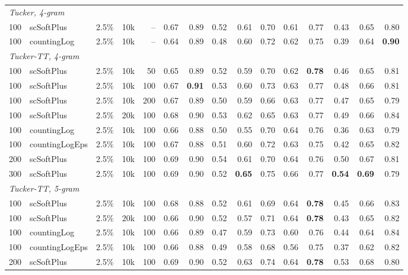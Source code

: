\begin{table}[t]
\begin{tabular}{rlrrrrrrrrrrrrr}
    \midrule
    \multicolumn{15}{l}{\textit{Tucker, 4-gram}} \\
    100 & scSoftPlus & 2.5\% & 10k & -- & 0.67 & 0.89 & 0.52 & 0.61 & 0.70 & 0.61 & 0.77 & 0.43 & 0.65 & 0.80 \\
    100 & countingLog & 2.5\% & 10k & -- & 0.64 & 0.89 & 0.48 & 0.60 & 0.72 & 0.62 & 0.75 & 0.39 & 0.64 & \textbf{0.90} \\
    \midrule
    \multicolumn{15}{l}{\textit{Tucker-TT, 4-gram}} \\
    100 & scSoftPlus & 2.5\% & 10k & 50 & 0.65 & 0.89 & 0.52 & 0.59 & 0.70 & 0.62 & \textbf{0.78} & 0.46 & 0.65 & 0.81 \\
    100 & scSoftPlus & 2.5\% & 10k & 100 & 0.67 & \textbf{0.91} & 0.53 & 0.60 & 0.73 & 0.63 & 0.77 & 0.48 & 0.66 & 0.81 \\
    100 & scSoftPlus & 2.5\% & 10k & 200 & 0.67 & 0.89 & 0.50 & 0.59 & 0.66 & 0.63 & 0.77 & 0.47 & 0.65 & 0.79 \\
    100 & scSoftPlus & 2.5\% & 20k & 100 & 0.68 & 0.90 & 0.53 & 0.62 & 0.65 & 0.63 & 0.77 & 0.49 & 0.66 & 0.84 \\
    100 & countingLog & 2.5\% & 10k & 100 & 0.66 & 0.88 & 0.50 & 0.55 & 0.70 & 0.64 & 0.76 & 0.36 & 0.63 & 0.79 \\
    100 & countingLogEps & 2.5\% & 10k & 100 & 0.67 & 0.88 & 0.51 & 0.60 & 0.72 & 0.63 & 0.75 & 0.42 & 0.65 & 0.82 \\
    200 & scSoftPlus & 2.5\% & 10k & 100 & 0.69 & 0.90 & 0.54 & 0.61 & 0.70 & 0.64 & 0.76 & 0.50 & 0.67 & 0.81 \\
    300 & scSoftPlus & 2.5\% & 10k & 100 & 0.69 & 0.90 & 0.52 & \textbf{0.65} & 0.75 & 0.66 & 0.77 & \textbf{0.54} & \textbf{0.69} & 0.79 \\
    \midrule
    \multicolumn{15}{l}{\textit{Tucker-TT, 5-gram}} \\
    100 & scSoftPlus & 2.5\% & 10k & 100 & 0.68 & 0.88 & 0.52 & 0.61 & 0.69 & 0.64 & \textbf{0.78} & 0.45 & 0.66 & 0.83 \\
    100 & scSoftPlus & 2.5\% & 20k & 100 & 0.66 & 0.90 & 0.52 & 0.57 & 0.71 & 0.64 & \textbf{0.78} & 0.43 & 0.65 & 0.82 \\
    100 & countingLog & 2.5\% & 10k & 100 & 0.66 & 0.89 & 0.47 & 0.59 & 0.73 & 0.60 & 0.76 & 0.44 & 0.64 & 0.84 \\
    100 & countingLogEps & 2.5\% & 10k & 100 & 0.66 & 0.88 & 0.49 & 0.58 & 0.68 & 0.56 & 0.75 & 0.37 & 0.62 & 0.82 \\
    200 & scSoftPlus & 2.5\% & 10k & 100 & 0.69 & 0.90 & 0.52 & 0.63 & 0.74 & 0.64 & \textbf{0.78} & 0.53 & 0.68 & 0.80 \\

\end{tabular}
\end{table}
